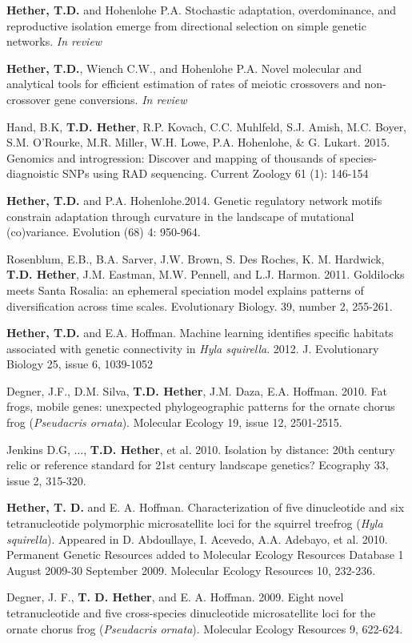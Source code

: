 \documentclass[letterpaper]{article}
\renewenvironment{itemize}{
  \begin{list}{}{
    \setlength{\leftmargin}{1.5em}
  }
}{
  \end{list}
}
\begin{document}
\begin{itemize}
\item \textbf{Hether, T.D.} and Hohenlohe P.A. Stochastic adaptation, overdominance, and reproductive isolation emerge from directional selection on simple genetic networks. \textit{In review}
\item \textbf{Hether, T.D.}, Wiench C.W., and Hohenlohe P.A. Novel molecular and analytical tools for efficient estimation of rates of meiotic crossovers and non-crossover gene conversions. \textit{In review}
\item Hand, B.K, \textbf{T.D. Hether}, R.P. Kovach, C.C. Muhlfeld, S.J. Amish, M.C. Boyer, S.M. O'Rourke, M.R. Miller, W.H. Lowe, P.A. Hohenlohe, \& G. Lukart. 2015. Genomics and introgression: Discover and mapping of thousands of species-diagnoistic SNPs using RAD sequencing.  Current Zoology 61 (1): 146-154
\item \textbf{Hether, T.D.} and P.A. Hohenlohe.2014. Genetic regulatory network motifs constrain adaptation through curvature in the landscape of mutational (co)variance. Evolution (68) 4: 950-964.
\item Rosenblum, E.B., B.A. Sarver, J.W. Brown, S. Des Roches, K. M. Hardwick, \textbf{T.D. Hether}, J.M. Eastman, M.W. Pennell, and L.J. Harmon. 2011. Goldilocks meets Santa Rosalia: an ephemeral speciation model explains patterns of diversification across time scales. Evolutionary Biology. 39, number 2, 255-261.
\item \textbf{Hether, T.D.} and E.A. Hoffman. Machine learning identifies specific habitats associated with genetic connectivity in \emph{Hyla squirella}. 2012. J. Evolutionary Biology 25, issue 6, 1039-1052
\item Degner, J.F., D.M. Silva, \textbf{T.D. Hether}, J.M. Daza, E.A. Hoffman. 2010. Fat frogs, mobile genes: unexpected phylogeographic patterns for the ornate chorus frog (\emph{Pseudacris ornata}). Molecular Ecology 19, issue 12, 2501-2515.
\item Jenkins D.G, ..., \textbf{T.D. Hether}, et al. 2010. Isolation by distance: 20th century relic or reference standard for 21st century landscape genetics?  Ecography 33, issue 2, 315-320.
\item \textbf{Hether, T. D.} and E. A. Hoffman. Characterization of five dinucleotide and six tetranucleotide polymorphic microsatellite loci for the squirrel treefrog (\emph{Hyla squirella}).  Appeared in D. Abdoullaye, I. Acevedo, A.A. Adebayo, et al. 2010. Permanent Genetic Resources added to Molecular Ecology Resources Database 1 August 2009-30 September 2009. Molecular Ecology Resources 10, 232-236.
\item Degner, J. F., \textbf{T. D. Hether}, and E. A. Hoffman. 2009. Eight novel tetranucleotide and five cross-species dinucleotide microsatellite loci for the ornate chorus frog (\emph{Pseudacris ornata}). Molecular Ecology Resources 9, 622-624.

\end{itemize}
\end{document}
